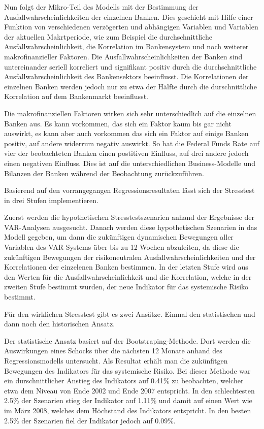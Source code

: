 \documentclass[a4paper,12pt]{scrartcl}
\begin{document}
Nun folgt der Mikro-Teil des Modells mit der Bestimmung der Ausfallwahrscheinlichkeiten der einzelnen Banken. Dies geschieht mit Hilfe einer Funktion von verschiedenen verzögerten und abhängigen Variablen und Variablen der aktuellen Makrtperiode, wie zum Beispiel die durchschnittliche Ausfallwahrscheinlichkeit, die Korrelation im Bankensystem und noch weiterer makrofinanzieller Faktoren.
Die Ausfallwahrscheinlichkeiten der Banken sind untereinander seriell korreliert und signifikant positiv durch die durchschnittliche Ausfallwahrscheinlichkeit des Bankensektors beeinflusst. Die Korrelationen der einzelnen Banken werden jedoch nur zu etwa der Hälfte durch die durschnittliche Korrelation auf dem Bankenmarkt beeinflusst. 

Die makrofinanziellen Faktoren wirken sich sehr unterschiedlich auf die einzelnen Banken aus. Es kann vorkommen, das sich ein Faktor kaum bis gar nicht auswirkt, es kann aber auch vorkommen das sich ein Faktor auf einige Banken positiv, auf andere widerrum negativ auswirkt. So hat die Federal Funds Rate auf vier der beobachteten Banken einen postitiven Einfluss, auf drei andere jedoch einen negativen Einfluss. Dies ist auf die unterschiedlichen Business-Modelle und Bilanzen der Banken während der Beobachtung zurückzuführen. 


Basierend auf den vorrangegangen Regressionsresultaten lässt sich der Stresstest in drei Stufen implementieren.

Zuerst werden die hypothetischen Stresstestszenarien anhand der Ergebnisse der VAR-Analysen ausgesucht.
Danach werden diese hypothetischen Szenarien in das Modell gegeben, um dann die zukünftigen dynamischen Bewegungen aller Variablen des VAR-Systems über bis zu 12 Wochen abzuleiten, da diese die zukünftigen Bewegungen der risikoneutralen Ausfallwahrscheinlichkeiten und der Korrelationen der einzelenen Banken bestimmen. 
In der letzten Stufe wird aus den Werten für die Ausfallwahrscheinlichkeit und die Korrelation, welche in der zweiten Stufe bestimmt wurden, der neue Indikator für das systemische Risiko bestimmt.


Für den wirklichen Stresstest gibt es zwei Ansätze. Einmal den statistischen und dann noch den historischen Ansatz.

Der statistische Ansatz basiert auf der Bootstraping-Methode. Dort werden die Auswirkungen eines Schocks über die nächsten 12 Monate anhand des Regressionsmodells untersucht. Als Resultat erhält man die zukünfitgen Bewegungen des Indikators für das systemische Risiko.
Bei dieser Methode war ein durschnittlicher Anstieg des Indikators auf 0.41\% zu beobachten, welcher etwa dem Niveau von Ende 2002 und Ende 2007 entspricht. In den schlechtesten 2.5\% der Szenarien stieg der Indikator auf 1.11\% und damit auf einen Wert wie im März 2008, welches dem Höchstand des Indikators entspricht. In den besten 2.5\% der Szenarien fiel der Indikator jedoch auf 0.09\%.
\end{document}
